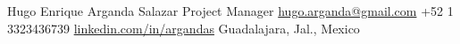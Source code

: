 
\customheader
    {Hugo Enrique Arganda Salazar}
    {Project Manager}
    {\href{mailto:hugo.arganda@gmail.com}{hugo.arganda@gmail.com}}
    {+52 1 3323436739}
    {\href{https://www.linkedin.com/in/argandas}{linkedin.com/in/argandas}}
    {Guadalajara, Jal., Mexico}

